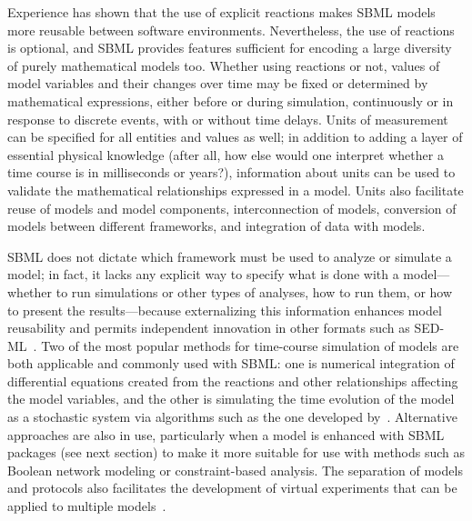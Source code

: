\documentclass[]{draft-sbml-paper}
\begin{document}
Experience has shown that the use of explicit reactions makes SBML models more reusable between software environments.  Nevertheless, the use of reactions is optional, and SBML provides features sufficient for encoding a large diversity of purely mathematical models too.  Whether using reactions or not, values of model variables and their changes over time may be fixed or determined by mathematical expressions, either before or during simulation, continuously or in response to discrete events, with or without time delays.  Units of measurement can be specified for all entities and values as well; in addition to adding a layer of essential physical knowledge (after all, how else would one interpret whether a time course is in milliseconds or years?), information about units can be used to validate the mathematical relationships expressed in a model.  Units also facilitate reuse of models and model components, interconnection of models, conversion of models between different frameworks, and integration of data with models.

SBML does not dictate which framework must be used to analyze or simulate a model; in fact, it lacks any explicit way to specify what is done with a model---whether to run simulations or other types of analyses, how to run them, or how to present the results---because externalizing this information enhances model reusability and permits independent innovation in other formats such as SED-ML~\citep{waltemath2011reproducible, Kohn2008sedml}. Two of the most popular methods for time-course simulation of models are both applicable and commonly used with SBML: one is numerical integration of differential equations created from the reactions and other relationships affecting the model variables, and the other is simulating the time evolution of the model as a stochastic system via algorithms such as the one developed by~\cite{gillespie1977exact}.  Alternative approaches are also in use, particularly when a model is enhanced with SBML packages (see next section) to make it more suitable for use with methods such as Boolean network modeling or constraint-based analysis.  The separation of models and protocols also facilitates the development of virtual experiments that can be applied to multiple models~\citep{Cooper2015call}.
\end{document}
